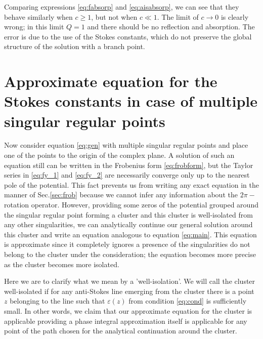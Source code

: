 \documentclass[aip,jmp,reprint]{revtex4-1}
\begin{document}
Comparing expressions \eqref{eq:fabsorp} and \eqref{eq:aisabsorp}, we can see that 
they behave similarly when $c \geq 1$, 
but not when $c \ll 1$. The limit of $c\rightarrow 0$ is clearly wrong; in this limit $Q=1$
and there should be no reflection and absorption. The error is due to the use of the Stokes constants, 
which do not preserve the global structure of the solution with a branch point. 

\section{Approximate equation for the Stokes constants in case of multiple singular regular points \label{sec:approx}}

Now consider equation \eqref{eq:gen} with multiple singular regular points and place one of the points
to the origin of the complex plane. A solution of such an equation still can be written in
the Frobenius form \eqref{eq:frobform}, but the Taylor series in \eqref{eq:fy_1} and \eqref{eq:fy_2}
are necessarily converge only up to the nearest pole of the potential\cite{cbbook}. This fact
prevents us from writing any exact equation in the manner of Sec.\ref{sec:frob} because
we cannot infer any information about the $2\pi-$rotation operator. However, providing some
zeros of the potential grouped around the singular regular point forming a cluster and this cluster is
well-isolated from any other singularities, we can analytically continue our general solution
around this cluster and write an equation analogous to equation \eqref{eq:main}. This equation
is approximate since it completely ignores a presence of the singularities do not belong to
the cluster under the consideration; the equation becomes more precise as the cluster
becomes more isolated. 

Here we are to clarify what we mean by a 'well-isolation'. We will call the cluster
well-isolated if for any anti-Stokes line emerging from the cluster there is a point $z$ belonging 
to the line such that $\varepsilon(z)$ from condition \eqref{eq:cond} is sufficiently small. In other words,
we claim that our approximate equation for the cluster is applicable providing a phase integral
approximation itself is applicable for any point of the path chosen for the analytical continuation 
around the cluster.
 
\end{document}
